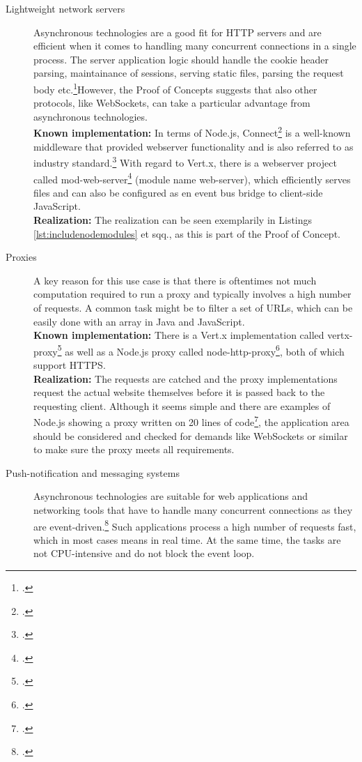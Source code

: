 \begin{description}
  
  \item[Lightweight network servers] Asynchronous technologies are a good fit for HTTP servers and are efficient when it comes to handling many concurrent connections in a single process. The server application logic should handle the cookie header parsing, maintainance of sessions, serving static files, parsing the request body etc.\footcite[Cf.][197 et seq,]{teixeira_2012}However, the Proof of Concepts suggests that also other protocols, like WebSockets, can take a particular advantage from asynchronous technologies.\\
\textbf{Known implementation:} In terms of Node.js, Connect\footcite[Cf.][]{Odell_2012} is a well-known middleware that provided webserver functionality and is also referred to as industry standard.\footcite[Cf.][145]{Roden_2012} With regard to Vert.x, there is a webserver project called mod-web-server\footcite[Cf.][]{vertxmodwebserver_2013} (module name web-server), which efficiently serves files and can also be configured as en event bus bridge to client-side JavaScript.\\
\textbf{Realization:} The realization can be seen exemplarily in Listings \ref{lst:includenodemodules} et sqq., as this is part of the Proof of Concept.
  \item[Proxies] A key reason for this use case is that there is oftentimes not much computation required to run a proxy and typically involves a high number of requests. A common task might be to filter a set of URLs, which can be easily done with an array in Java and JavaScript.\\
\textbf{Known implementation:} There is a Vert.x implementation called vertx-proxy\footcite[Cf.][]{vertxproxy} as well as a Node.js proxy called node-http-proxy\footcite[Cf.][]{nodeproxy}, both of which support HTTPS.\\
\textbf{Realization:} The requests are catched and the proxy implementations request the actual website themselves before it is passed back to the requesting client. Although it seems simple and there are examples of Node.js showing a proxy written on 20 lines of code\footcite[Cf.][]{krumins_nodeproxy}, the application area should be considered and checked for demands like WebSockets or similar to make sure the proxy meets all requirements.
  \item[Push-notification and messaging systems] Asynchronous technologies are suitable for web applications and networking tools that have to handle many concurrent connections as they are event-driven.\footcite[Cf.][17]{teixeira_2012} Such applications process a high number of requests fast, which in most cases means in real time. At the same time, the tasks are not CPU-intensive and do not block the event loop. \\

\end{description}
